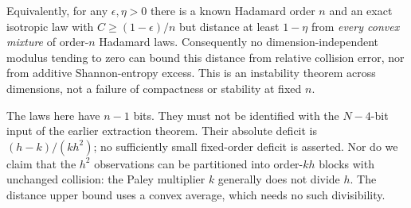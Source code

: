 \documentclass[11pt]{article}
\begin{document}
Equivalently, for any $\epsilon,\eta>0$ there is a known Hadamard
order $n$ and an exact isotropic law with
$C\ge(1-\epsilon)/n$ but distance at least $1-\eta$ from
\emph{every convex mixture} of order-$n$ Hadamard laws.
Consequently no dimension-independent modulus tending to zero can
bound this distance from relative collision error, nor from additive
Shannon-entropy excess. This is an instability theorem across
dimensions, not a failure of compactness or stability at fixed $n$.

The laws here have $n-1$ bits. They must not be identified with the
$N-4$-bit input of the earlier extraction theorem. Their absolute
deficit is $(h-k)/(kh^2)$; no sufficiently small fixed-order deficit
is asserted. Nor do we claim that the $h^2$ observations can be
partitioned into order-$kh$ blocks with unchanged collision:
the Paley multiplier $k$ generally does not divide $h$. The distance
upper bound uses a convex average, which needs no such divisibility.
\end{document}
